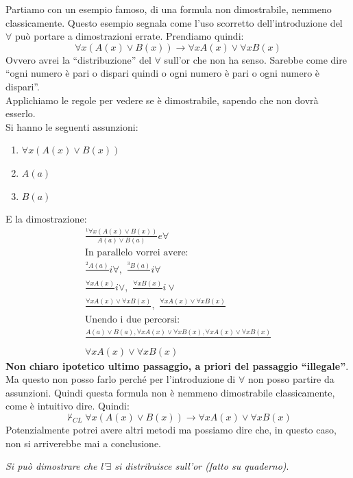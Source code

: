 \documentclass[a4paper,12pt, oneside]{book}
\begin{document}
\begin{esempio}
  Partiamo con un esempio famoso, di una formula non dimostrabile, nemmeno
  classicamente. Questo esempio segnala come l'uso scorretto dell'introduzione
  del $\forall$ può portare a dimostrazioni errate. Prendiamo quindi:
  \[\forall x(A(x)\lor B(x))\to\forall xA(x)\lor\forall xB(x)\]
  Ovvero avrei la ``distribuzione'' del $\forall$ sull'or che non ha
  senso. Sarebbe come dire ``ogni numero è pari o dispari quindi o ogni numero è
  pari o ogni numero è dispari''.\\
  Applichiamo le regole per vedere se è dimostrabile, sapendo che non dovrà
  esserlo.\\
  Si hanno le seguenti assunzioni:
  \begin{enumerate}
    \item $\forall x(A(x)\lor B(x))$
    \item $A(a)$
    \item $B(a)$
  \end{enumerate}
  E la dimostrazione:
  \begin{gather*}
    \frac{^1\forall x(A(x)\lor B(x))}{A(a)\lor B(a)}e\forall\\
    \mbox{In parallelo vorrei avere:}\\ 
    \frac{^2A(a)}{}i\forall,\,\,\frac{^3B(a)}{}i\forall\\
    \frac{\forall xA(x)}{}i\lor,\,\,\frac{\forall xB(x)}{}i\lor\\
    \frac{\forall xA(x)\lor\forall xB(x)}{},\,\,\frac{\forall xA(x)\lor\forall
      xB(x)}{} \\
    \mbox{Unendo i due percorsi:}\\
    \frac{A(a)\lor B(a), \forall xA(x)\lor\forall xB(x), \forall
      xA(x)\lor\forall xB(x)}{} \\
    \forall xA(x)\lor\forall xB(x)
  \end{gather*}
  \textbf{Non chiaro ipotetico ultimo passaggio, a priori del passaggio
    ``illegale''}.\\ 
  Ma questo non posso farlo perché per l'introduzione di $\forall$ non posso
  partire da assunzioni. Quindi questa formula non è nemmeno dimostrabile
  classicamente, come è intuitivo dire. Quindi:
  \[\nvdash_{CL}\forall x(A(x)\lor B(x))\to\forall xA(x)\lor\forall xB(x)\]
  Potenzialmente potrei avere altri metodi ma possiamo dire che, in questo caso,
  non si arriverebbe mai a conclusione.
\end{esempio}
\textit{Si può dimostrare che l'$\exists$ si distribuisce sull'or (fatto su
  quaderno)}.\\ 
\end{document}
